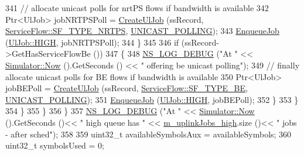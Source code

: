 \begin{DoxyCode}
341                       \textcolor{comment}{// allocate unicast polls for nrtPS flows if bandwidth is available}
342                       Ptr<UlJob> jobNRTPSPoll = \hyperlink{classns3_1_1UplinkSchedulerMBQoS_a09c9fce5d8872eaf5cdf60209a556e21}{CreateUlJob} (ssRecord, 
      \hyperlink{classns3_1_1ServiceFlow_a7990ba10be1e098328fd1e6382a26235a7f8577f851a9f01d159442a3a3fcdf48}{ServiceFlow::SF\_TYPE\_NRTPS}, \hyperlink{namespacens3_a534f9a14e4d9aeb5b400e61f152a73a2ab774c9fb3410eec7ee3c8367c50ccbb3}{UNICAST\_POLLING});
343                       \hyperlink{classns3_1_1UplinkSchedulerMBQoS_ad18bfc130fac723e65ada63fc3719b44}{EnqueueJob} (\hyperlink{classns3_1_1UlJob_a6ae1d8e2e490a32ee1bc8aae661f4983a5094609e73e947663a497fd927ce562e}{UlJob::HIGH}, jobNRTPSPoll);
344                     \}
345 
346                   \textcolor{keywordflow}{if} (ssRecord->GetHasServiceFlowBe ())
347                     \{
348                       \hyperlink{group__logging_ga413f1886406d49f59a6a0a89b77b4d0a}{NS\_LOG\_DEBUG} (\textcolor{stringliteral}{"At "} << \hyperlink{classns3_1_1Simulator_ac3178fa975b419f7875e7105be122800}{Simulator::Now} ().GetSeconds () << \textcolor{stringliteral}{"
       offering be unicast polling"});
349                       \textcolor{comment}{// finally allocate unicast polls for BE flows if bandwidth is available}
350                       Ptr<UlJob> jobBEPoll = \hyperlink{classns3_1_1UplinkSchedulerMBQoS_a09c9fce5d8872eaf5cdf60209a556e21}{CreateUlJob} (ssRecord, 
      \hyperlink{classns3_1_1ServiceFlow_a7990ba10be1e098328fd1e6382a26235af93a8bd8fce654e688f957f6f362e5c7}{ServiceFlow::SF\_TYPE\_BE}, \hyperlink{namespacens3_a534f9a14e4d9aeb5b400e61f152a73a2ab774c9fb3410eec7ee3c8367c50ccbb3}{UNICAST\_POLLING});
351                       \hyperlink{classns3_1_1UplinkSchedulerMBQoS_ad18bfc130fac723e65ada63fc3719b44}{EnqueueJob} (\hyperlink{classns3_1_1UlJob_a6ae1d8e2e490a32ee1bc8aae661f4983a5094609e73e947663a497fd927ce562e}{UlJob::HIGH}, jobBEPoll);
352                     \}
353                 \}
354             \}
355         \}
356     \}
357   \hyperlink{group__logging_ga413f1886406d49f59a6a0a89b77b4d0a}{NS\_LOG\_DEBUG} (\textcolor{stringliteral}{"At "} << \hyperlink{classns3_1_1Simulator_ac3178fa975b419f7875e7105be122800}{Simulator::Now} ().GetSeconds ()<< \textcolor{stringliteral}{" high queue has "} << 
      \hyperlink{classns3_1_1UplinkSchedulerMBQoS_acb8b5539e366b4942381b08edccfba4b}{m\_uplinkJobs\_high}.size ()<< \textcolor{stringliteral}{" jobs - after sched"});
358 
359   uint32\_t availableSymbolsAux = availableSymbols;
360   uint32\_t symbolsUsed = 0;

\end{DoxyCode}
